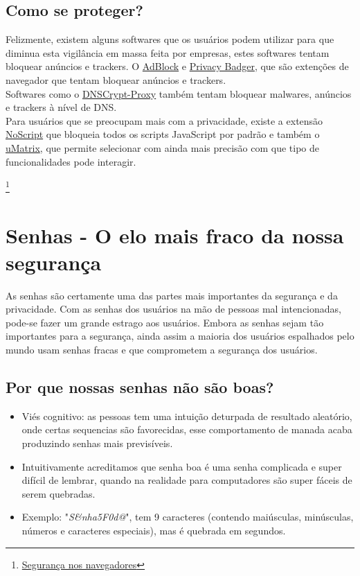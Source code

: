\documentclass[12pt, letterpaper, Monospace:12]{report}
\begin{document}
\subsection{Como se proteger?}
	Felizmente, existem alguns softwares que os usuários podem utilizar para que diminua esta vigilância em massa feita por empresas, estes softwares tentam bloquear anúncios e trackers. O \href{https://adblockplus.org/}{AdBlock} e \href{https://www.eff.org/privacybadger}{Privacy Badger}, que são extenções de navegador que tentam bloquear anúncios e trackers.\\

	Softwares como o \href{https://linuxroot.noblogs.org/post/2017/07/06/instalando-e-usando-o-dnscrypt-proxy/}{DNSCrypt-Proxy} também tentam bloquear malwares, anúncios e trackers à nível de DNS.\\

	Para usuários que se preocupam mais com a privacidade, existe a extensão \href{https://noscript.net}{NoScript} que bloqueia todos os scripts JavaScript por padrão e também o \href{https://addons.mozilla.org/en-US/firefox/addon/umatrix/}{uMatrix}, que permite selecionar com ainda mais precisão com que tipo de funcionalidades pode interagir.

\footnote{\href{https://linuxroot.noblogs.org/post/2017/07/13/seguranca-nos-navegadores/}{Segurança nos navegadores}}

\pagebreak

\section{Senhas - O elo mais fraco da nossa segurança}

As senhas são certamente uma das partes mais importantes da segurança e da privacidade. Com as senhas dos usuários na mão de pessoas mal intencionadas, pode-se fazer um grande estrago aos usuários. Embora as senhas sejam tão importantes para a segurança, ainda assim a maioria dos usuários espalhados pelo mundo usam senhas fracas e que comprometem a segurança dos usuários.\\

\subsection{Por que nossas senhas não são boas?}

\begin{itemize}
	\item Viés cognitivo: as pessoas tem uma intuição deturpada de resultado aleatório, onde certas sequencias são favorecidas, esse comportamento de manada acaba produzindo senhas mais previsíveis.
	\item Intuitivamente acreditamos que senha boa é uma senha complicada e super difícil de lembrar, quando na realidade para computadores são super fáceis de serem quebradas.
	\item Exemplo: "\textit{S\&nha5F0d@}", tem 9 caracteres (contendo maiúsculas, minúsculas, números e caracteres especiais), mas é quebrada em segundos.
\end{itemize}
\end{document}
